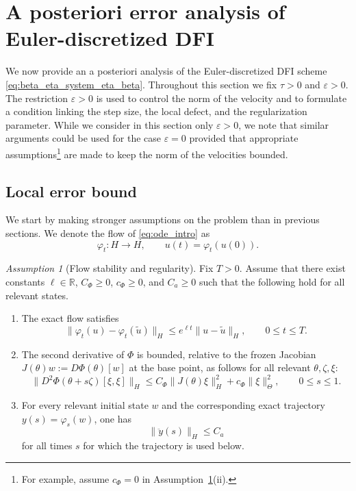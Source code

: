 \documentclass[oneside,11pt]{article}
\theoremstyle{remark}
\theoremstyle{thmstyleone}
\theoremstyle{thmstylethree}
\newtheorem{assumption}[theorem]{Assumption}
\theoremstyle{thmstyletwo}
\newcommand{\R}{\mathbb{R}}
\newcommand{\norm}[1]{\lVert #1\rVert}
\newcommand{\tc}[1]{#1}
\begin{document}
\section{A posteriori error analysis of Euler-discretized DFI}
\label{sec:error_analysis}
We now provide an a posteriori analysis of the Euler-discretized DFI scheme \eqref{eq:beta_eta_system_eta_beta}. Throughout this section we fix $\tau>0$ and $\varepsilon>0$.
  \tc{The restriction $\varepsilon>0$ is used to control the norm of the velocity and to formulate a condition linking the step size, the local defect, and the regularization parameter. While we consider in this section only $\varepsilon > 0$, we note that similar arguments could be used for the case $\varepsilon=0$ provided that appropriate assumptions\footnote{For example, assume $c_{\Phi} = 0$ in Assumption~\ref{ass:flow_stability_new}(ii).} are made to keep the norm of the velocities bounded.}  
   


\subsection{Local error bound}
We start by making stronger assumptions on the problem than in previous sections. We denote the flow of \eqref{eq:ode_intro} as
\begin{equation}
  \varphi_t:H\to H,
  \qquad u(t)=\varphi_t(u(0)).
  \label{eq:exact_flow}
\end{equation}
\begin{assumption}[Flow stability and regularity]
  \label{ass:flow_stability_new}
  Fix $T>0$.
  Assume that there exist constants $\ell\in\R$, $C_\Phi\ge0$, $c_\Phi\ge0$, and $C_a\ge0$ such that the following hold for all relevant states.
  \begin{enumerate}[label=\textnormal{(\roman*)},leftmargin=2.5em]
    \item The exact flow satisfies
          \begin{equation}
            \norm{\varphi_t(u)-\varphi_t(\widetilde u)}_H
            \le e^{\ell t}\norm{u-\widetilde u}_H,
            \qquad 0\le t\le T.
            \label{eq:flow_stability_new}
          \end{equation}
    \item The second derivative of $\Phi$ is bounded, relative to the frozen Jacobian $J(\theta)w:=D\Phi(\theta)[w]$ at the base point, as follows for all relevant $\theta,\zeta,\xi$:
          \begin{equation}
            \norm{D^2\Phi(\theta+s\zeta)[\xi,\xi]}_H
            \le
            C_\Phi\norm{J(\theta)\xi}_H^2
            +
            c_\Phi\norm{\xi}_\Theta^2,
            \qquad 0\le s\le 1.
            \label{eq:D2Phi_bound_new}
          \end{equation}
    \item For every relevant initial state $w$ and the corresponding exact trajectory $y(s)=\varphi_s(w)$, one has
          \[
            \norm{\ddot y(s)}_H\le C_a
          \]
          for all times $s$ for which the trajectory is used below.
  \end{enumerate}
\end{assumption}
\end{document}
